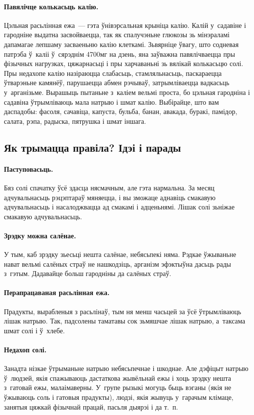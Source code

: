 \paragraph{Павялічце колькасьць калію.}
Цэльная расьлінная ежа~--- гэта ўнівэрсальная крыніца калію. Калій у~садавіне і гародніне выдатна засвойваецца, так як спалучэньне глюкозы зь мінэраламі дапамагае лепшаму засваеньню калію клеткамі. Зьвярніце ўвагу, што содневая патрэба ў~каліі ў~сярэднім 4700мг на дзень, яна заўважна павялічваецца пры фізычных нагрузках, цяжарнасьці і пры харчаваньні зь вялікай колькасьцю солі. Пры недахопе калію назіраюцца слабасьць, стамляльнасьць, паскараецца ўтварэньне камянёў, парушаецца абмен рэчываў, затрымліваецца вадкасьць у~арганізьме. Вырашыць пытаньне з~каліем вельмі проста, бо цэльная гародніна і садавіна ўтрымліваюць мала натрыю і шмат калію. Выбірайце, што вам даспадобы: фасоля, сачавіца, капуста, бульба, банан, авакада, буракі, памідор, салата, рэпа, радыска, пятрушка і шмат іншага.

\subsection{Як трымацца правіла? Ідэі і парады}

\paragraph{Паступовасьць.}
Бяз солі спачатку ўсё здасца нясмачным, але гэта нармальна. За месяц адчувальнасьць рэцэптараў мяняецца, і вы зможаце аднавіць смакавую адчувальнасьць і насалоджвацца ад смакамі і адценьнямі. Лішак солі зьніжае смакавую адчувальнасьць.

\paragraph{Зрэдку можна салёнае.}
У тым, каб зрэдку зьесьці нешта салёнае, небясьпекі няма. Рэдкае ўжываньне нават вельмі салёных страў не нашкодзіць, арганізм эфэктыўна дасьць рады з~гэтым. Дадавайце больш гародніны да салёных страў.

\paragraph{Перапрацаваная расьлінная ежа.}
Прадукты, вырабленыя з расьлінаў, тым ня менш часьцей за ўсё ўтрымліваюць лішак натрыю. Так, падсолены таматавы сок зьмяшчае лішак натрыю, а~таксама шмат солі і ў~хлебе.

\paragraph{Недахоп солі.}
Занадта нізкае ўтрыманьне натрыю небясьпечнае і шкоднае. Але дэфіцыт натрыю ў~людзей, якія спажываюць дастаткова жывёльнай ежы і хоць зрэдку нешта з~гатовай ежы, малаімаверны. У~групе рызыкі могуць быць вэганы (якія не ўжываюць соль і гатовыя прадукты), людзі, якія жывуць у~гарачым клімаце, занятыя цяжкай фізычнай працай, пасьля дыярэі і да т.~п.

